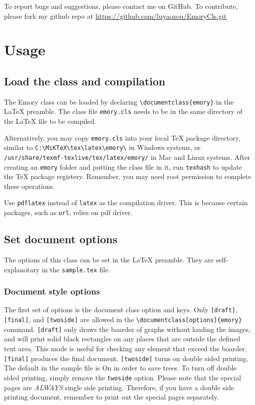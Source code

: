 \documentclass[draft, twoside]{emory}
\begin{document}
To report bugs and suggestions, please contact me on GitHub. To contribute, 
please fork my github repo at \url{https://github.com/luyaozou/EmoryCls.git}

\chapter{Usage}
\section{Load the class and compilation}
The Emory class can be loaded by declaring
\Verb|\documentclass{emory}| in the \LaTeX{} preamble. The class file
\Verb|emory.cls| needs to be in the same directory of the \LaTeX{} file to be 
compiled. 

Alternatively, you may copy \Verb|emory.cls| into your local \TeX{} package 
directory, similar to \Verb|C:\MiKTeX\tex\latex\emory\| in Windows systems, or\\
\Verb|/usr/share/texmf-texlive/tex/latex/emory/| in Mac and Linux systems. After
creating an \Verb|emory| folder and putting the class file in it, run
\Verb|texhash| to update the \TeX{} package registery. Remember, you may need
root permission to complete these operations. 

Use \Verb|pdflatex| instead of \Verb|latex| as the compilation driver. This
is because certain packages, such as \Verb|url|, relies on pdf driver. 


\section{Set document options}\label{sec:options}
The options of this class can be set in the \LaTeX{} preamble. They are 
self-explanotary in the \Verb|sample.tex| file. 

\subsection{Document style options}
The first set of options is the document class option and keys. Only \Verb|[draft]|,
\Verb|[final]|, and \Verb|[twoside]| are allowed in the \Verb|\documentclass[options]{emory}| 
command. \Verb|[draft]| only draws the boarder of graphs without loading the images,
and will print solid black rectangles on any places that are outside the defined
text area. This mode is useful for checking any element that exceed the boarder.
\Verb|[final]| produces the final document. \Verb|[twoside]| turns on double sided
printing. The default in the sample file is On in order to save trees. To turn
off double sided printing, simply remove the \Verb|twoside| option.
Please note that the special pages are \emph{ALWAYS} single side printing. 
Therefore, if you have a double side printing document, remember to print out
the special pages separately.
\end{document}

